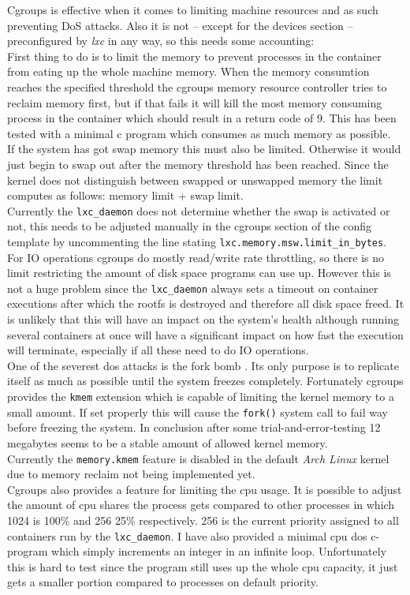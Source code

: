 Cgroups is effective when it comes to limiting machine resources and as such preventing DoS attacks.
Also it is not -- except for the devices section -- preconfigured by \textit{lxc} in any way, so this needs some accounting:\\
First thing to do is to limit the memory to prevent processes in the container from eating up the whole machine memory.
When the memory consumtion reaches the specified threshold the cgroups memory resource controller tries to reclaim memory first,
but if that fails it will kill the most memory consuming process in the container which should result in a return code of 9\cite{cgrpmem}.
This has been tested with a minimal c program which consumes as much memory as possible.\\
If the system has got swap memory this must also be limited. Otherwise it would just begin to swap out after the memory
threshold has been reached. Since the kernel does not distinguish between swapped or unswapped memory the limit computes as follows:
memory limit + swap limit.\\
Currently the \texttt{lxc\_daemon} does not determine whether the swap is activated or not, this needs to be adjusted manually in the cgroups
section of the config template by uncommenting the line stating \texttt{lxc.memory.msw.limit\_in\_bytes}.\\
For IO operations cgroups do mostly read/write rate throttling, so there is no limit restricting the amount of disk space programs
can use up. However this is not a huge problem since the \texttt{lxc\_daemon} always sets a timeout on container executions after which the
rootfs is destroyed and therefore all disk space freed. It is unlikely that this will have an impact on the system's health although
running several containers at once will have a significant impact on how fast the execution will terminate, especially if all these
need to do IO operations.\\
One of the severest dos attacks is the fork bomb \cite{forkbomb}. Its only purpose is to replicate itself as much as possible until
the system freezes completely. Fortunately cgroups provides
the \texttt{kmem} extension which is capable of limiting the kernel memory to a small amount. If set properly this will cause the \texttt{fork()}
system call to fail way before freezing the system. In conclusion after some trial-and-error-testing 12 megabytes seems to be a
stable amount of allowed kernel memory.\\
Currently the \texttt{memory.kmem} feature is disabled in the default \textit{Arch Linux} kernel due to memory reclaim not being implemented yet\cite{kmembug}.\\
Cgroups also provides a feature for limiting the cpu usage. It is possible to adjust the amount of cpu shares the process gets compared to
other processes in which 1024 is 100\% and 256 25\% respectively. 256 is the current priority assigned to all containers run by the \texttt{lxc\_daemon}.
I have also provided a minimal cpu dos c-program which simply increments an integer in an infinite loop. Unfortunately this is hard to test
since the program still uses up the whole cpu capacity, it just gets a smaller portion compared to processes on default priority.

